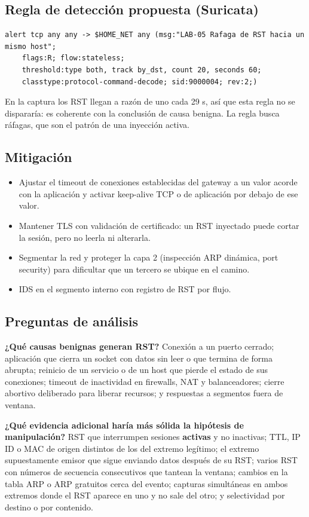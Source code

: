 \subsection{Regla de detección propuesta (Suricata)}

\begin{lstlisting}
alert tcp any any -> $HOME_NET any (msg:"LAB-05 Rafaga de RST hacia un mismo host";
    flags:R; flow:stateless;
    threshold:type both, track by_dst, count 20, seconds 60;
    classtype:protocol-command-decode; sid:9000004; rev:2;)
\end{lstlisting}

En la captura los RST llegan a razón de uno cada 29 s, así que esta regla no se dispararía: es coherente con la conclusión de causa benigna. La regla busca ráfagas, que son el patrón de una inyección activa.

\subsection{Mitigación}

\begin{itemize}
  \item Ajustar el timeout de conexiones establecidas del gateway a un valor acorde con la aplicación y activar keep-alive TCP o de aplicación por debajo de ese valor.
  \item Mantener TLS con validación de certificado: un RST inyectado puede cortar la sesión, pero no leerla ni alterarla.
  \item Segmentar la red y proteger la capa 2 (inspección ARP dinámica, port security) para dificultar que un tercero se ubique en el camino.
  \item IDS en el segmento interno con registro de RST por flujo.
\end{itemize}

\subsection{Preguntas de análisis}

\textbf{¿Qué causas benignas generan RST?} Conexión a un puerto cerrado; aplicación que cierra un socket con datos sin leer o que termina de forma abrupta; reinicio de un servicio o de un host que pierde el estado de sus conexiones; timeout de inactividad en firewalls, NAT y balanceadores; cierre abortivo deliberado para liberar recursos; y respuestas a segmentos fuera de ventana.

\textbf{¿Qué evidencia adicional haría más sólida la hipótesis de manipulación?} RST que interrumpen sesiones \textbf{activas} y no inactivas; TTL, IP ID o MAC de origen distintos de los del extremo legítimo; el extremo supuestamente emisor que sigue enviando datos después de \guillemotleft{}su\guillemotright{} RST; varios RST con números de secuencia consecutivos que tantean la ventana; cambios en la tabla ARP o ARP gratuitos cerca del evento; capturas simultáneas en ambos extremos donde el RST aparece en uno y no sale del otro; y selectividad por destino o por contenido.

